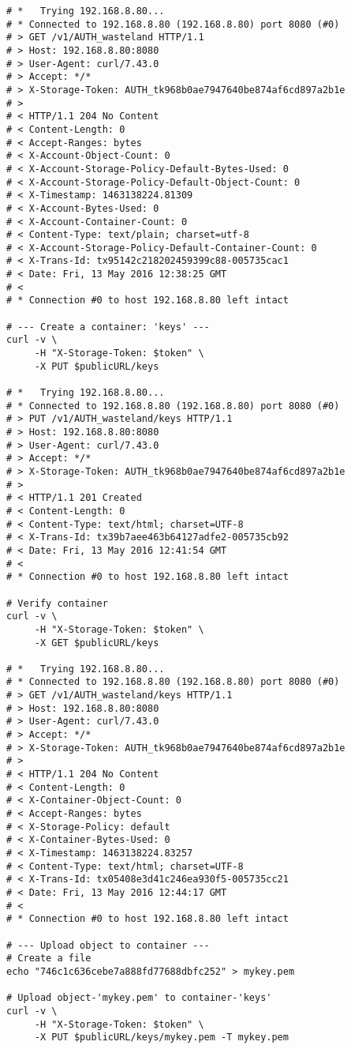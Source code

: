 \documentclass{article}
\begin{document}
\begin{itemize}
\begin{verbatim}
# *   Trying 192.168.8.80...
# * Connected to 192.168.8.80 (192.168.8.80) port 8080 (#0)
# > GET /v1/AUTH_wasteland HTTP/1.1
# > Host: 192.168.8.80:8080
# > User-Agent: curl/7.43.0
# > Accept: */*
# > X-Storage-Token: AUTH_tk968b0ae7947640be874af6cd897a2b1e
# >
# < HTTP/1.1 204 No Content
# < Content-Length: 0
# < Accept-Ranges: bytes
# < X-Account-Object-Count: 0
# < X-Account-Storage-Policy-Default-Bytes-Used: 0
# < X-Account-Storage-Policy-Default-Object-Count: 0
# < X-Timestamp: 1463138224.81309
# < X-Account-Bytes-Used: 0
# < X-Account-Container-Count: 0
# < Content-Type: text/plain; charset=utf-8
# < X-Account-Storage-Policy-Default-Container-Count: 0
# < X-Trans-Id: tx95142c218202459399c88-005735cac1
# < Date: Fri, 13 May 2016 12:38:25 GMT
# <
# * Connection #0 to host 192.168.8.80 left intact

# --- Create a container: 'keys' ---
curl -v \
     -H "X-Storage-Token: $token" \
     -X PUT $publicURL/keys

# *   Trying 192.168.8.80...
# * Connected to 192.168.8.80 (192.168.8.80) port 8080 (#0)
# > PUT /v1/AUTH_wasteland/keys HTTP/1.1
# > Host: 192.168.8.80:8080
# > User-Agent: curl/7.43.0
# > Accept: */*
# > X-Storage-Token: AUTH_tk968b0ae7947640be874af6cd897a2b1e
# >
# < HTTP/1.1 201 Created
# < Content-Length: 0
# < Content-Type: text/html; charset=UTF-8
# < X-Trans-Id: tx39b7aee463b64127adfe2-005735cb92
# < Date: Fri, 13 May 2016 12:41:54 GMT
# <
# * Connection #0 to host 192.168.8.80 left intact

# Verify container
curl -v \
     -H "X-Storage-Token: $token" \
     -X GET $publicURL/keys

# *   Trying 192.168.8.80...
# * Connected to 192.168.8.80 (192.168.8.80) port 8080 (#0)
# > GET /v1/AUTH_wasteland/keys HTTP/1.1
# > Host: 192.168.8.80:8080
# > User-Agent: curl/7.43.0
# > Accept: */*
# > X-Storage-Token: AUTH_tk968b0ae7947640be874af6cd897a2b1e
# >
# < HTTP/1.1 204 No Content
# < Content-Length: 0
# < X-Container-Object-Count: 0
# < Accept-Ranges: bytes
# < X-Storage-Policy: default
# < X-Container-Bytes-Used: 0
# < X-Timestamp: 1463138224.83257
# < Content-Type: text/html; charset=UTF-8
# < X-Trans-Id: tx05408e3d41c246ea930f5-005735cc21
# < Date: Fri, 13 May 2016 12:44:17 GMT
# <
# * Connection #0 to host 192.168.8.80 left intact

# --- Upload object to container ---
# Create a file
echo "746c1c636cebe7a888fd77688dbfc252" > mykey.pem

# Upload object-'mykey.pem' to container-'keys'
curl -v \
     -H "X-Storage-Token: $token" \
     -X PUT $publicURL/keys/mykey.pem -T mykey.pem


\end{verbatim}
\end{itemize}
\end{document}
